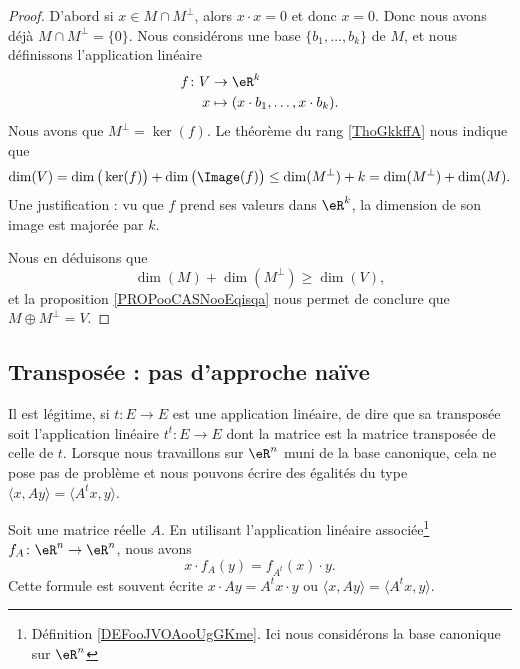 \begin{proof}
    D'abord si \( x\in M\cap M^{\perp}\), alors \( x\cdot x=0\) et donc \( x=0\). Donc nous avons déjà \( M\cap M^{\perp}=\{ 0 \}\). Nous considérons une base \( \{b_1,\ldots, b_k\}\) de \( M\), et nous définissons l'application linéaire
    \begin{equation}
        \begin{aligned}
            f\colon V&\to \eR^k \\
            x&\mapsto (x\cdot b_1,\ldots, x\cdot b_k). 
        \end{aligned}
    \end{equation}
    Nous avons que \( M^{\perp}=\ker(f)\). Le théorème du rang \ref{ThoGkkffA} nous indique que
    \begin{equation}
        \dim(V)=\dim\big( \ker(f) \big)+\dim\big( \Image(f) \big)\leq \dim(M^{\perp})+k=\dim(M^{\perp})+\dim(M).
    \end{equation}
    Une justification : vu que \( f\) prend ses valeurs dans \( \eR^k\), la dimension de son image est majorée par \( k\).

    Nous en déduisons que 
    \begin{equation}
        \dim(M)+\dim(M^{\perp})\geq\dim(V),
    \end{equation}
    et la proposition \ref{PROPooCASNooEqisqa} nous permet de conclure que \( M\oplus M^{\perp}=V\).
\end{proof}


\subsection{Transposée : pas d'approche naïve}
\label{SUBSECooGPXVooEYwIiJ}

Il est légitime, si \( t\colon E\to E\) est une application linéaire, de dire que sa transposée soit l'application linéaire \( t^t\colon E\to E\) dont la matrice est la matrice transposée de celle de \( t\). Lorsque nous travaillons sur \( \eR^n\) muni de la base canonique, cela ne pose pas de problème et nous pouvons écrire des égalités du type \( \langle x, Ay\rangle =\langle A^tx, y\rangle \).

\begin{proposition}     \label{PROPooNARVooEuhweD}
    Soit une matrice réelle \( A\). En utilisant l'application linéaire associée\footnote{Définition \ref{DEFooJVOAooUgGKme}. Ici nous considérons la base canonique sur \( \eR^n\)} \( f_A\colon \eR^n\to \eR^n\), nous avons
    \begin{equation}
        x\cdot f_A(y)=f_{A^t}(x)\cdot y.
    \end{equation}
    Cette formule est souvent écrite \( x\cdot Ay=A^tx\cdot y\) ou \( \langle x, Ay\rangle =\langle A^tx, y\rangle \).
\end{proposition}

